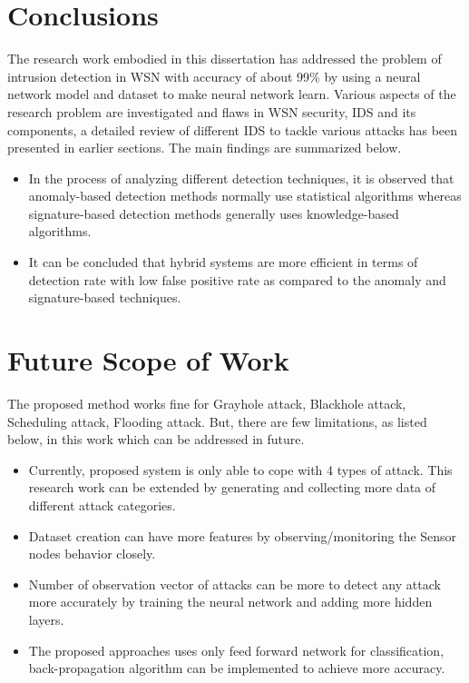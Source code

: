 \section{Conclusions}
The research work embodied in this dissertation has addressed the problem of intrusion detection in WSN with accuracy of about 99\% by using a neural network model and dataset to make neural network learn. Various aspects of the research problem are investigated and flaws in WSN security, IDS and its components, a detailed review of different IDS to tackle various attacks has been presented in earlier sections. The main findings are summarized below.
\begin{itemize}
	\item In the process of analyzing different detection techniques, it is observed that anomaly-based detection methods normally use statistical algorithms whereas signature-based detection methods generally uses knowledge-based algorithms.
	\item It can be concluded that hybrid systems are more efficient in terms of detection rate with low false positive rate as compared to the anomaly and signature-based techniques.
\end{itemize}
\section{Future Scope of Work}
The proposed method works fine for Grayhole attack, Blackhole attack, Scheduling attack, Flooding attack. But, there are few limitations, as listed below, in this work which can be addressed in future.
\begin{itemize}
	\item Currently, proposed system is only able to cope with 4 types of attack. This research work can be extended by generating and collecting more data of different attack categories.
	\item Dataset creation can have more features by observing/monitoring the Sensor nodes behavior closely.
	\item Number of observation vector of attacks can be more to detect any attack more accurately by training the neural network and adding more hidden layers.
	\item The proposed approaches uses only feed forward network for classification, back-propagation algorithm can be implemented to achieve more accuracy.
	
\end{itemize}


